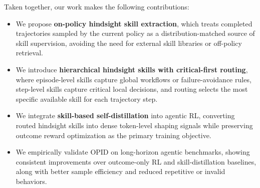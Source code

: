 Taken together, our work makes the following contributions:
\begin{itemize}
    \item We propose \textbf{on-policy hindsight skill extraction}, which treats completed trajectories sampled by the current policy as a distribution-matched source of skill supervision, avoiding the need for external skill libraries or off-policy retrieval.

    \item We introduce \textbf{hierarchical hindsight skills with critical-first routing}, where episode-level skills capture global workflows or failure-avoidance rules, step-level skills 
    capture critical local decisions, and routing selects the most specific available skill for each trajectory step.

    \item We integrate \textbf{skill-based self-distillation} into agentic RL, converting routed hindsight skills into dense token-level shaping signals while preserving outcome reward optimization as the primary training objective.

    \item We empirically validate OPID on long-horizon agentic benchmarks, showing consistent improvements over outcome-only RL and skill-distillation baselines, along with better sample efficiency and reduced repetitive or invalid behaviors.
\end{itemize}
